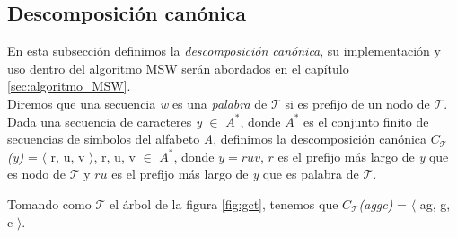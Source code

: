 \subsection{Descomposición canónica}
\label{subsec:desc_canonica}
En esta subsección definimos la \emph{descomposición canónica}, su implementación y uso dentro del algoritmo MSW serán abordados en el capítulo \ref{sec:algoritmo_MSW}.\\
Diremos que una secuencia {\it w} es una \emph{palabra} de $\mathcal{T}$ si es prefijo de un nodo de $\mathcal{T}$.\\
Dada una secuencia de caracteres {\it y} $\in$ {\it $A^{*}$}, donde {\it $A^{*}$} es el conjunto finito de secuencias de símbolos del alfabeto {\it A}, definimos la descomposición canónica {\it $C_{\mathcal{T}}$(y)} =  $\langle$ r, u, v $\rangle$, r, u, v $\in$ {\it $A^{*}$}, donde  $y = ruv$, $r$ es el prefijo más largo de {\it y} que es nodo de $\mathcal{T}$ y $ru$ es el prefijo más largo de {\it y} que es palabra de $\mathcal{T}$. 
\begin{example*}
Tomando como $\mathcal{T}$ el árbol de la figura \ref{fig:gct}, tenemos que {\it $C_{\mathcal{T}}$(aggc)} = $\langle$ ag, g, c $\rangle$.\\
\end{example*}
\myrule{}{}

